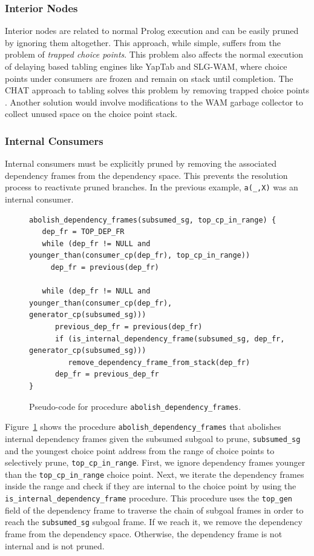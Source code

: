 \subsubsection{Interior Nodes}

Interior nodes are related to normal Prolog execution and can be easily pruned
by ignoring them altogether. This approach, while simple, suffers from the problem of \textit{trapped
choice points}. This problem also affects the normal execution of delaying based tabling engines like
YapTab and SLG-WAM, where choice points under consumers are frozen and remain on stack until completion.
The CHAT approach to tabling solves this problem by removing trapped choice points \cite{Demoen-99b}.
Another solution would involve modifications to the WAM garbage collector to collect unused space on
the choice point stack.

\subsubsection{Internal Consumers}   
   
Internal consumers must be explicitly pruned by removing the associated dependency frames from the dependency
space. This prevents the resolution process to reactivate pruned branches. In the previous example, \texttt{a(\_,X)}
was an internal consumer.

\begin{figure}[ht]
\begin{Verbatim}
abolish_dependency_frames(subsumed_sg, top_cp_in_range) {
   dep_fr = TOP_DEP_FR
   while (dep_fr != NULL and younger_than(consumer_cp(dep_fr), top_cp_in_range))
     dep_fr = previous(dep_fr)
     
   while (dep_fr != NULL and younger_than(consumer_cp(dep_fr), generator_cp(subsumed_sg)))
      previous_dep_fr = previous(dep_fr)
      if (is_internal_dependency_frame(subsumed_sg, dep_fr, generator_cp(subsumed_sg)))
         remove_dependency_frame_from_stack(dep_fr)
      dep_fr = previous_dep_fr
}
\end{Verbatim}
\caption{Pseudo-code for procedure \texttt{abolish\_dependency\_frames}.}
\label{fig:abolish_dependency_frames}
\end{figure}
   
Figure~\ref{fig:abolish_dependency_frames} shows the procedure \texttt{abolish\_dependency\_frames}
that abolishes internal dependency frames given the subsumed subgoal to prune, \texttt{subsumed\_sg} and
the youngest choice point address from the range of choice points to selectively prune, \texttt{top\_cp\_in\_range}.
First, we ignore dependency frames younger than the \texttt{top\_cp\_in\_range} choice point.
Next, we iterate the dependency frames inside the range and check if they are internal to the choice point
by using the \texttt{is\_internal\_dependency\_frame} procedure. This procedure uses the \texttt{top\_gen}
field of the dependency frame to traverse the chain of subgoal frames in order to reach the \texttt{subsumed\_sg}
subgoal frame. If we reach it, we remove the dependency frame from the dependency space. Otherwise,
the dependency frame is not internal and is not pruned.

